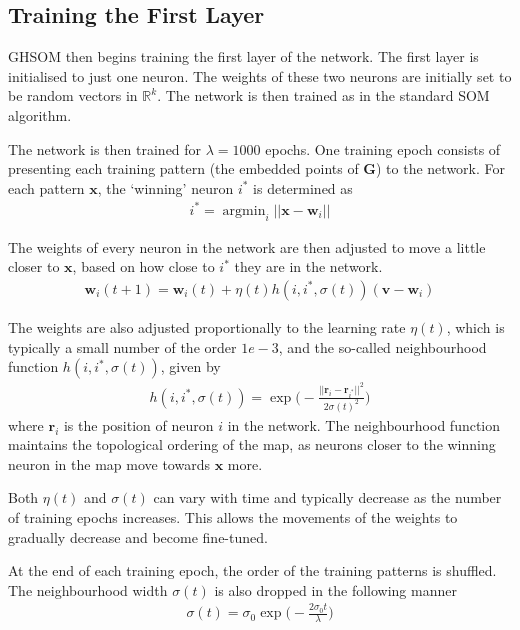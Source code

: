 \documentclass{report}
\DeclareMathOperator*{\argmin}{argmin}
\begin{document}
\subsection{Training the First Layer}
GHSOM then begins training the first layer of the network. The first layer is initialised to just one neuron. The weights of these two neurons are initially set to be random vectors in $\mathbb{R}^k$. The network is then trained as in the standard SOM algorithm.

The network is then trained for $\lambda=1000$ epochs. One training epoch consists of presenting each training pattern (the embedded points of $\textbf{G}$) to the network. For each pattern $\textbf{x}$, the `winning' neuron $i^*$ is determined as
\begin{align*}
i^* = \argmin_i  ||\textbf{x} - \textbf{w}_i||
\end{align*}

The weights of every neuron in the network are then adjusted to move a little closer to $\textbf{x}$, based on how close to $i^*$ they are in the network.
\begin{align*}
\textbf{w}_i(t+1) = \textbf{w}_i(t) + \eta(t) h(i, i^*, \sigma(t)) (\textbf{v} - \textbf{w}_i)
\end{align*}

The weights are also adjusted proportionally to the learning rate $\eta(t)$, which is typically a small number of the order $1e-3$, and the so-called neighbourhood function $h(i, i^*, \sigma(t))$, given by
\begin{align*}
h(i, i^*, \sigma(t)) = \exp\Bigg(-\frac{||\textbf{r}_i-\textbf{r}_{i^*}||^2}{2\sigma(t)^2}\Bigg)
\end{align*}
where $\textbf{r}_i$ is the position of neuron $i$ in the network. The neighbourhood function maintains the topological ordering of the map, as neurons closer to the winning neuron in the map move towards $\textbf{x}$ more.

Both $\eta(t)$ and $\sigma(t)$ can vary with time and typically decrease as the number of training epochs increases. This allows the movements of the weights to gradually decrease and become fine-tuned.

At the end of each training epoch, the order of the training patterns is shuffled. The neighbourhood width $\sigma(t)$ is also dropped in the following manner
\begin{align*}
\sigma(t) = \sigma_0 \exp \Bigg(-\frac{2 \sigma_0 t}{\lambda}\Bigg)
\end{align*}
\end{document}
